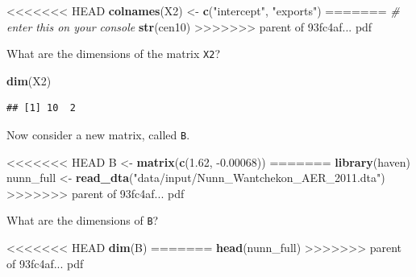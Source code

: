 \documentclass[]{book}
\newenvironment{Shaded}{\begin{snugshade}}{\end{snugshade}}
\newcommand{\CommentTok}[1]{\textcolor[rgb]{0.56,0.35,0.01}{\textit{#1}}}
\newcommand{\FloatTok}[1]{\textcolor[rgb]{0.00,0.00,0.81}{#1}}
\newcommand{\KeywordTok}[1]{\textcolor[rgb]{0.13,0.29,0.53}{\textbf{#1}}}
\newcommand{\NormalTok}[1]{#1}
\newcommand{\StringTok}[1]{\textcolor[rgb]{0.31,0.60,0.02}{#1}}
\theoremstyle{definition}
\theoremstyle{definition}
\theoremstyle{definition}
\theoremstyle{remark}
\begin{document}
\begin{Shaded}
\begin{Highlighting}[]
\begin{Shaded}
\begin{Highlighting}[]
\begin{Shaded}
\begin{Highlighting}[]
<<<<<<< HEAD
\KeywordTok{colnames}\NormalTok{(X2) <{-}}\StringTok{ }\KeywordTok{c}\NormalTok{(}\StringTok{"intercept"}\NormalTok{, }\StringTok{"exports"}\NormalTok{)}
=======
\CommentTok{# enter this on your console}
\KeywordTok{str}\NormalTok{(cen10)}
>>>>>>> parent of 93fc4af... pdf
\end{Highlighting}
\end{Shaded}

What are the dimensions of the matrix \texttt{X2}?

\begin{Shaded}
\begin{Highlighting}[]
\KeywordTok{dim}\NormalTok{(X2)}
\end{Highlighting}
\end{Shaded}

\begin{verbatim}
## [1] 10  2
\end{verbatim}

Now consider a new matrix, called \texttt{B}.

\begin{Shaded}
\begin{Highlighting}[]
<<<<<<< HEAD
\NormalTok{B <{-}}\StringTok{ }\KeywordTok{matrix}\NormalTok{(}\KeywordTok{c}\NormalTok{(}\FloatTok{1.62}\NormalTok{, }\FloatTok{{-}0.00068}\NormalTok{))}
=======
\KeywordTok{library}\NormalTok{(haven)}
\NormalTok{nunn_full <-}\StringTok{ }\KeywordTok{read_dta}\NormalTok{(}\StringTok{"data/input/Nunn_Wantchekon_AER_2011.dta"}\NormalTok{)}
>>>>>>> parent of 93fc4af... pdf
\end{Highlighting}
\end{Shaded}

What are the dimensions of \texttt{B}?

\begin{Shaded}
\begin{Highlighting}[]
<<<<<<< HEAD
\KeywordTok{dim}\NormalTok{(B)}
=======
\KeywordTok{head}\NormalTok{(nunn_full)}
>>>>>>> parent of 93fc4af... pdf
\end{Highlighting}
\end{Shaded}


\end{Highlighting}
\end{Shaded}
\end{Highlighting}
\end{Shaded}
\end{document}
